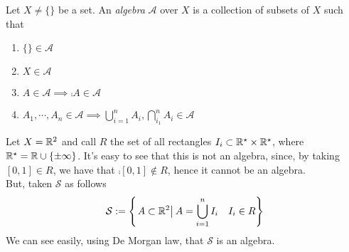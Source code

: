 \documentclass[../complete.tex]{subfiles}
\begin{document}
\begin{dfn}[Algebra]
	Let $X\ne\{\}$ be a set. An \textit{algebra} $\mathcal{A}$ over $X$ is a collection of subsets of $X$ such that
	\begin{enumerate}
	\item $\{\}\in\mathcal{A}$
	\item $X\in\mathcal{A}$
	\item $A\in\mathcal{A}\implies\comp{A}\in\mathcal{A}$
	\item $A_1,\cdots,A_n\in\mathcal{A}\implies\bigcup_{i=1}^nA_i,\bigcap_{i_1}^nA_i\in\mathcal{A}$
	\end{enumerate}
\end{dfn}
\begin{eg}
	Let $X=\mathbb{R}^2$ and call $R$ the set of all rectangles $I_i\subset\mathbb{R}^{\star}\times\mathbb{R}^\star$, where $\mathbb{R}^\star=\mathbb{R}\cup\{\pm\infty\}$. It's easy to see that this is not an algebra, since, by taking $[0,1]\in R$, we have that $\comp{[0,1]}\notin R$, hence it cannot be an algebra.\\
	But, taken $\mathcal{S}$ as follows
	\begin{equation*}
		\mathcal{S}:=\left\{\left.A\subset\mathbb{R}^2\right|_{}A=\bigcup_{i=1}^nI_i\quad I_i\in R\right\}
	\end{equation*}
	We can see easily, using De Morgan law, that $\mathcal{S}$ is an algebra.
\end{eg}
\end{document}
